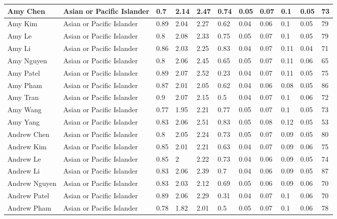 \begin{table}[!ht]
\begin{tabular}{|l|l|l|l|l|l|l|l|l|l|l|}
        Amy Chen & Asian or Pacific Islander & 0.7 & 2.14 & 2.47 & 0.74 & 0.05 & 0.07 & 0.1 & 0.05 & 73 \\ \hline
        Amy Kim & Asian or Pacific Islander & 0.89 & 2.04 & 2.27 & 0.62 & 0.04 & 0.06 & 0.1 & 0.05 & 79 \\ \hline
        Amy Le & Asian or Pacific Islander & 0.8 & 2.08 & 2.33 & 0.75 & 0.05 & 0.07 & 0.1 & 0.05 & 79 \\ \hline
        Amy Li & Asian or Pacific Islander & 0.86 & 2.03 & 2.25 & 0.83 & 0.04 & 0.07 & 0.11 & 0.04 & 71 \\ \hline
        Amy Nguyen & Asian or Pacific Islander & 0.8 & 2.06 & 2.45 & 0.65 & 0.05 & 0.07 & 0.11 & 0.06 & 65 \\ \hline
        Amy Patel & Asian or Pacific Islander & 0.89 & 2.07 & 2.52 & 0.23 & 0.04 & 0.07 & 0.11 & 0.05 & 75 \\ \hline
        Amy Pham & Asian or Pacific Islander & 0.87 & 2.01 & 2.05 & 0.62 & 0.04 & 0.06 & 0.08 & 0.05 & 86 \\ \hline
        Amy Tran & Asian or Pacific Islander & 0.9 & 2.07 & 2.15 & 0.5 & 0.04 & 0.07 & 0.1 & 0.06 & 72 \\ \hline
        Amy Wang & Asian or Pacific Islander & 0.77 & 1.95 & 2.21 & 0.77 & 0.05 & 0.07 & 0.1 & 0.05 & 73 \\ \hline
        Amy Yang & Asian or Pacific Islander & 0.83 & 2.06 & 2.51 & 0.83 & 0.05 & 0.08 & 0.12 & 0.05 & 53 \\ \hline
        Andrew Chen & Asian or Pacific Islander & 0.8 & 2.05 & 2.24 & 0.73 & 0.05 & 0.07 & 0.09 & 0.05 & 80 \\ \hline
        Andrew Kim & Asian or Pacific Islander & 0.85 & 2.01 & 2.21 & 0.63 & 0.04 & 0.07 & 0.09 & 0.06 & 75 \\ \hline
        Andrew Le & Asian or Pacific Islander & 0.85 & 2 & 2.22 & 0.73 & 0.04 & 0.06 & 0.09 & 0.05 & 74 \\ \hline
        Andrew Li & Asian or Pacific Islander & 0.83 & 2.06 & 2.39 & 0.7 & 0.04 & 0.06 & 0.09 & 0.05 & 87 \\ \hline
        Andrew Nguyen & Asian or Pacific Islander & 0.83 & 2.03 & 2.12 & 0.69 & 0.05 & 0.06 & 0.09 & 0.06 & 70 \\ \hline
        Andrew Patel & Asian or Pacific Islander & 0.89 & 2.06 & 2.29 & 0.31 & 0.04 & 0.07 & 0.1 & 0.06 & 70 \\ \hline
        Andrew Pham & Asian or Pacific Islander & 0.78 & 1.82 & 2.01 & 0.5 & 0.05 & 0.07 & 0.1 & 0.06 & 78 \\ \hline

\end{tabular}
\end{table}
